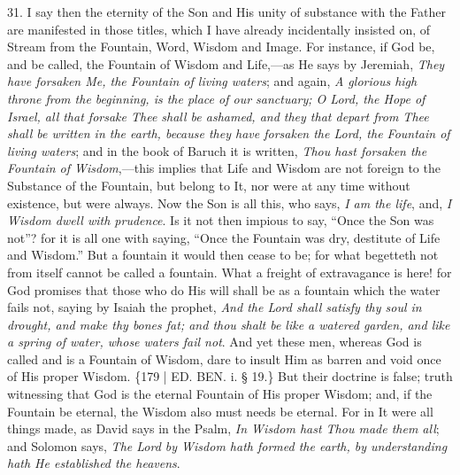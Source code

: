 31. I say then the eternity of
the Son and His unity of substance with the Father are manifested in
those titles, which I have already incidentally insisted on, of Stream
from the Fountain, Word, Wisdom and Image. For instance, if God be,
and be called, the Fountain of Wisdom and Life,—as He says by
Jeremiah, \emph{They have forsaken Me, the Fountain of living waters};
and again, \emph{A glorious high throne from the beginning, is the place
of our sanctuary; O Lord, the Hope of Israel, all that forsake Thee
shall be ashamed, and they that depart from Thee shall be written in
the earth, because they have forsaken the Lord, the Fountain of living
waters}; and in the book of Baruch it is written, \emph{Thou hast
forsaken the Fountain of Wisdom},—this implies that Life and
Wisdom are not foreign to the Substance of the Fountain, but belong to
It, nor were at any time without existence, but were always. Now the
Son is all this, who says, \emph{I am the life}, and, \emph{I Wisdom
dwell with prudence}. Is it not then impious to say, ``Once the Son
was not''? for it is all one with saying, ``Once the Fountain was dry,
destitute of Life and Wisdom.'' But a fountain it would then cease to
be; for what begetteth not from itself cannot be called a fountain.
What a freight of extravagance is here! for God promises that those
who do His will shall be as a fountain which the water fails not,
saying by Isaiah the prophet, \emph{And the Lord shall satisfy thy soul
in drought, and make thy bones fat; and thou shalt be like a watered
garden, and like a spring of water, whose waters fail not}. And yet
these men, whereas God is called and is a Fountain of Wisdom, dare to
insult Him as barren and void once of His proper Wisdom. \{179 | ED.
BEN. i. § 19.\} But their doctrine is false;
truth witnessing that God is the eternal Fountain of His proper
Wisdom; and, if the Fountain be eternal, the Wisdom also must needs be
eternal. For in It were all things made, as David says in the Psalm, \emph{In
Wisdom hast Thou made them all}; and Solomon says, \emph{The Lord by
Wisdom hath formed the earth, by understanding hath He established the
heavens}.

